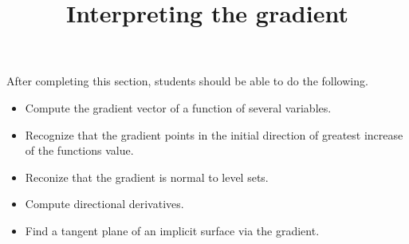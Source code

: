 \documentclass{ximera}
\title{Interpreting the gradient}
\begin{document}
\begin{abstract}
\end{abstract}

\maketitle

\begin{sectionOutcomes}

After completing this section, students should be able to do the following.

\begin{itemize}
\item Compute the gradient vector of a function of several variables.
\item Recognize that the gradient points in the initial direction of
  greatest increase of the functions value.
\item Reconize that the gradient is normal to level sets.
\item Compute directional derivatives.
\item Find a tangent plane of an implicit surface via the gradient.
\end{itemize}

\end{sectionOutcomes}
\end{document}
